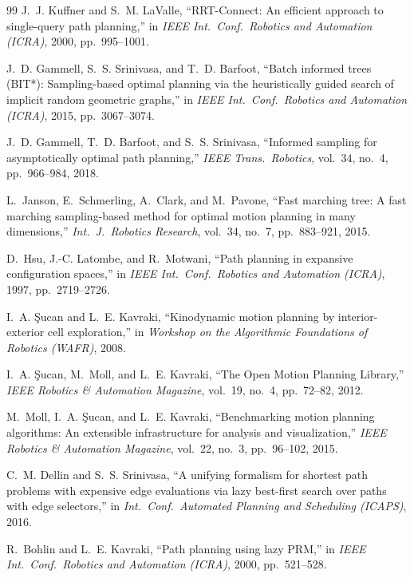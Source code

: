 \documentclass[journal]{IEEEtran}
\begin{document}
\begin{thebibliography}{99}
J.~J. Kuffner and S.~M. LaValle, ``RRT-Connect: An efficient
approach to single-query path planning,'' in \emph{IEEE Int.\ Conf.\
Robotics and Automation (ICRA)}, 2000, pp.~995--1001.

J.~D. Gammell, S.~S. Srinivasa, and T.~D. Barfoot, ``Batch informed
trees (BIT*): Sampling-based optimal planning via the heuristically
guided search of implicit random geometric graphs,'' in \emph{IEEE
Int.\ Conf.\ Robotics and Automation (ICRA)}, 2015, pp.~3067--3074.

J.~D. Gammell, T.~D. Barfoot, and S.~S. Srinivasa, ``Informed
sampling for asymptotically optimal path planning,'' \emph{IEEE
Trans.\ Robotics}, vol.~34, no.~4, pp.~966--984, 2018.

L.~Janson, E.~Schmerling, A.~Clark, and M.~Pavone, ``Fast marching
tree: A fast marching sampling-based method for optimal motion
planning in many dimensions,'' \emph{Int.\ J.\ Robotics Research},
vol.~34, no.~7, pp.~883--921, 2015.

D.~Hsu, J.-C. Latombe, and R.~Motwani, ``Path planning in expansive
configuration spaces,'' in \emph{IEEE Int.\ Conf.\ Robotics and
Automation (ICRA)}, 1997, pp.~2719--2726.

I.~A. {\c S}ucan and L.~E. Kavraki, ``Kinodynamic motion planning by
interior-exterior cell exploration,'' in \emph{Workshop on the
Algorithmic Foundations of Robotics (WAFR)}, 2008.

I.~A. {\c S}ucan, M.~Moll, and L.~E. Kavraki, ``The Open Motion
Planning Library,'' \emph{IEEE Robotics \& Automation Magazine},
vol.~19, no.~4, pp.~72--82, 2012.

M.~Moll, I.~A. {\c S}ucan, and L.~E. Kavraki, ``Benchmarking motion
planning algorithms: An extensible infrastructure for analysis and
visualization,'' \emph{IEEE Robotics \& Automation Magazine},
vol.~22, no.~3, pp.~96--102, 2015.

C.~M. Dellin and S.~S. Srinivasa, ``A unifying formalism for
shortest path problems with expensive edge evaluations via lazy
best-first search over paths with edge selectors,'' in \emph{Int.\
Conf.\ Automated Planning and Scheduling (ICAPS)}, 2016.

R.~Bohlin and L.~E. Kavraki, ``Path planning using lazy PRM,'' in
\emph{IEEE Int.\ Conf.\ Robotics and Automation (ICRA)}, 2000,
pp.~521--528.


\end{thebibliography}
\end{document}
